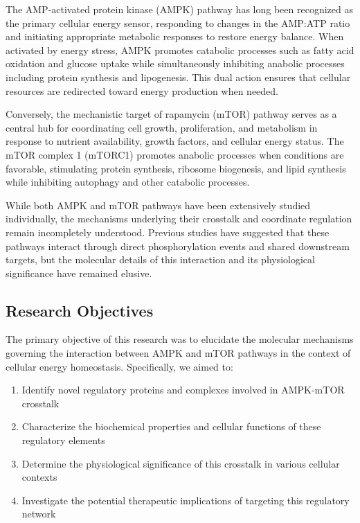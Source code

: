 \documentclass[11
pt,a4paper]{article}
\begin{document}
The AMP-activated protein kinase (AMPK) pathway has long been recognized as the primary cellular energy sensor, responding to changes in the AMP:ATP ratio and initiating appropriate metabolic responses to restore energy balance. When activated by energy stress, AMPK promotes catabolic processes such as fatty acid oxidation and glucose uptake while simultaneously inhibiting anabolic processes including protein synthesis and lipogenesis. This dual action ensures that cellular resources are redirected toward energy production when needed.

Conversely, the mechanistic target of rapamycin (mTOR) pathway serves as a central hub for coordinating cell growth, proliferation, and metabolism in response to nutrient availability, growth factors, and cellular energy status. The mTOR complex 1 (mTORC1) promotes anabolic processes when conditions are favorable, stimulating protein synthesis, ribosome biogenesis, and lipid synthesis while inhibiting autophagy and other catabolic processes.

While both AMPK and mTOR pathways have been extensively studied individually, the mechanisms underlying their crosstalk and coordinate regulation remain incompletely understood. Previous studies have suggested that these pathways interact through direct phosphorylation events and shared downstream targets, but the molecular details of this interaction and its physiological significance have remained elusive.

\subsection{Research Objectives}

The primary objective of this research was to elucidate the molecular mechanisms governing the interaction between AMPK and mTOR pathways in the context of cellular energy homeostasis. Specifically, we aimed to:

\begin{enumerate}
\item Identify novel regulatory proteins and complexes involved in AMPK-mTOR crosstalk
\item Characterize the biochemical properties and cellular functions of these regulatory elements
\item Determine the physiological significance of this crosstalk in various cellular contexts
\item Investigate the potential therapeutic implications of targeting this regulatory network
\end{enumerate}
\end{document}
